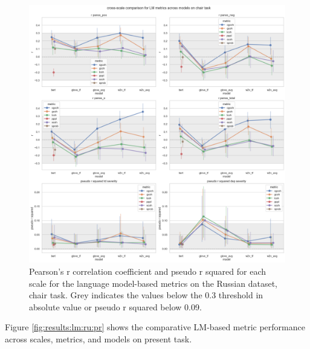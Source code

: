 \begin{figure}[ht!]
    \includegraphics[width=1.1\textwidth, center]{Figures/chapter_4/LM/ru_chair_scale_r.png} 
\captionsetup{width=\textwidth}
\caption[LM Metrics: Russian, Chair Task]{\label{fig:results:lm:ru:ch} Pearson's r correlation coefficient and pseudo r squared for each scale for the language model-based metrics on the Russian dataset, chair task. Grey indicates the values below the 0.3 threshold in absolute value or pseudo r squared below 0.09.}
\end{figure}

\clearpage
Figure \ref{fig:results:lm:ru:pr} shows the comparative LM-based metric performance across scales, metrics, and models on present task. 

